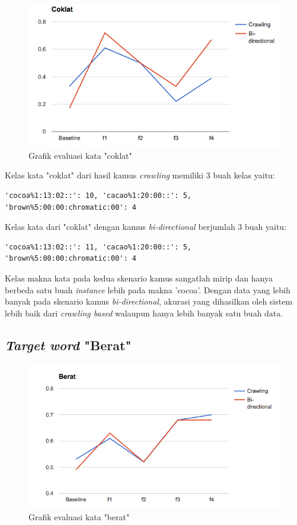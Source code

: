 \begin{figure}
	\centering
	\includegraphics[width=1\linewidth]{adit_pics/coklat.png}
	\caption{Grafik evaluasi kata "coklat"}
	\label{fig:coklat}
\end{figure}

Kelas kata "coklat" dari hasil kamus \textit{crawling} memiliki 3 buah kelas yaitu:
\begin{lstlisting}
'cocoa%1:13:02::': 10, 'cacao%1:20:00::': 5, 'brown%5:00:00:chromatic:00': 4
\end{lstlisting}
Kelas kata dari "coklat" dengan kamus \textit{bi-directional} berjumlah 3 buah yaitu:
\begin{lstlisting}
'cocoa%1:13:02::': 11, 'cacao%1:20:00::': 5, 'brown%5:00:00:chromatic:00': 4
\end{lstlisting}

Kelas makna kata pada kedua skenario kamus sangatlah mirip dan hanya berbeda satu buah \textit{instance} lebih pada makna 'cocoa'. Dengan data yang lebih banyak pada skenario kamus \textit{bi-directional}, akurasi yang dihasilkan oleh sistem lebih baik dari \textit{crawling based} walaupun hanya lebih banyak satu buah data.

\subsection{\textit{Target word} "Berat"}

\begin{figure}
	\centering
	\includegraphics[width=1\linewidth]{adit_pics/berat.png}
	\caption{Grafik evaluasi kata "berat"}
	\label{fig:berat}
\end{figure}

